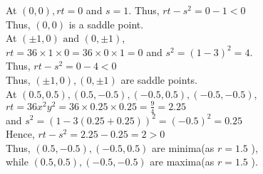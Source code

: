 \documentclass[20pt,a4paper]{extarticle} %
\theoremstyle{definition}
\theoremstyle{definition}
\begin{document}
At $(0,0), rt=0$ and $s=1$. Thus, $rt-s^2=0-1<0 $\\
Thus, $(0,0)$ is a saddle point.\\

At $(\pm 1,0) \text{ and } (0, \pm 1)$,\\
$rt=36\times 1 \times 0=36 \times 0 \times 1=0$ and $s^2=(1-3)^2=4$.\\
Thus, $rt-s^2=0-4<0$\\
Thus, $(\pm 1,0) , (0, \pm 1)$ are saddle points.\\

At $(0.5,0.5),(0.5,-0.5),(-0.5,0.5),(-0.5,-0.5)$,\\
$rt=36x^2y^2=36 \times 0.25 \times 0.25=\frac{9}{4}=2.25$ \\ and $s^2=(1-3(0.25+0.25))^2=(-0.5)^2=0.25$\\
Hence, $rt-s^2=2.25-0.25=2>0$ \\
Thus, $(0.5,-0.5),(-0.5,0.5)$ are minima(as $r=1.5$ ),\\ while $(0.5,0.5),(-0.5,-0.5)$ are maxima(as $r=1.5$ ).
\pagebreak
\end{document}

